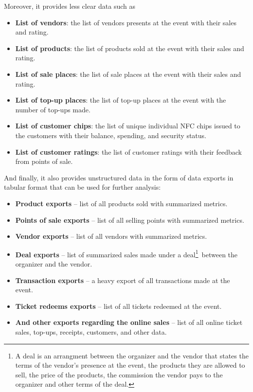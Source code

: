 Moreover, it provides less clear data such as
\begin{itemize}
	\item \textbf{List of vendors}: the list of vendors presents at the event with their sales and rating.
	\item \textbf{List of products}: the list of products sold at the event with their sales and rating.
	\item \textbf{List of sale places}: the list of sale places at the event with their sales and rating.
	\item \textbf{List of top-up places}: the list of top-up places at the event with the number of top-ups made.
	\item \textbf{List of customer chips}: the list of unique individual NFC chips issued to the customers with their balance, spending, and security status.
	\item \textbf{List of customer ratings}: the list of customer ratings with their feedback from points of sale.
\end{itemize}

And finally, it also provides unstructured data in the form of data exports in tabular format that can be used for further analysis:
\begin{itemize}
	\item \textbf{Product exports} – list of all products sold with summarized metrics.
	\item \textbf{Points of sale exports} – list of all selling points with summarized metrics.
	\item \textbf{Vendor exports} – list of all vendors with summarized metrics.
	\item \textbf{Deal exports} – list of summarized sales made under a deal\footnote{
		A deal is an arrangment between the organizer and the vendor that states the terms of the vendor's presence at the event, the products they are allowed to sell, the price of the products, the commission the vendor pays to the organizer and other terms of the deal.
	}~between the organizer and the vendor.
	\item \textbf{Transaction exports} – a heavy export of all transactions made at the event.
	\item \textbf{Ticket redeems exports} – list of all tickets redeemed at the event.
	\item \textbf{And other exports regarding the online sales} – list of all online ticket sales, top-ups, receipts, customers, and other data.
\end{itemize}


